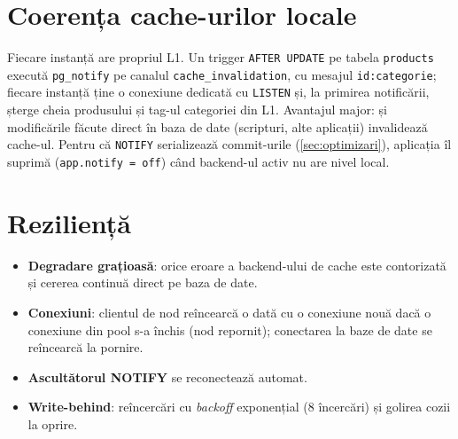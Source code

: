 \section{Coerența cache-urilor locale}

Fiecare instanță are propriul L1. Un trigger \texttt{AFTER UPDATE} pe tabela \texttt{products} execută
\texttt{pg\_notify} pe canalul \texttt{cache\_invalidation}, cu mesajul \texttt{id:categorie}; fiecare instanță ține o conexiune dedicată
cu \texttt{LISTEN} și, la primirea notificării, șterge cheia produsului și tag-ul categoriei din L1.
Avantajul major: și modificările făcute direct în baza de date (scripturi, alte aplicații) invalidează
cache-ul. Pentru că \texttt{NOTIFY} serializează commit-urile (\cref{sec:optimizari}), aplicația îl
suprimă (\texttt{app.notify = off}) când backend-ul activ nu are nivel local.

\section{Reziliență}

\begin{itemize}
  \item \textbf{Degradare grațioasă}: orice eroare a backend-ului de cache este contorizată și cererea
        continuă direct pe baza de date.
  \item \textbf{Conexiuni}: clientul de nod reîncearcă o dată cu o conexiune nouă dacă o conexiune din pool
        s-a închis (nod repornit); conectarea la baze de date se reîncearcă la pornire.
  \item \textbf{Ascultătorul NOTIFY} se reconectează automat.
  \item \textbf{Write-behind}: reîncercări cu \emph{backoff} exponențial (8 încercări) și golirea cozii la oprire.
\end{itemize}
